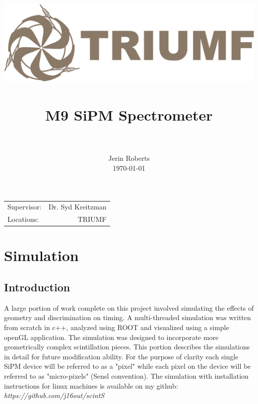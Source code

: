 \documentclass[paper=a4, fontsize=11pt]{scrartcl}
\title{
		\usefont{OT1}{bch}{b}{n}
		\normalfont \normalsize \textsc{} \\ [25pt]
		\includegraphics[width=0.5\linewidth]{tri} \\
		\horrule{0.5pt} \\[0.2cm]
		\huge M9 SiPM Spectrometer \\
		\horrule{2pt} \\[0.005cm]
}
\author{
		\normalfont 								\normalsize
        Jerin Roberts\\[-5pt]		\normalsize
        \today
}
\date{}
\numberwithin{equation}{section}		%
\numberwithin{figure}{section}			%
\numberwithin{table}{section}				%
\begin{document}
\maketitle
\begin{center}
\begin{tabular}{l r}


Supervisor: & Dr. Syd Kreitzman  \\ %
Locations: & TRIUMF


\end{tabular}
\end{center}
\newpage
\tableofcontents
\listoffigures
\listoftables
\newpage
\lstset{language=[Visual]C++}

\section{Simulation}
\subsection{Introduction}
A large portion of work complete on this project involved simulating the effects of geometry and discrimination on timing. A multi-threaded simulation was written from scratch in c++, analyzed using ROOT and visualized using a simple openGL application. The simulation was designed to incorporate more geometrically complex scintillation pieces. This portion describes the simulations in detail for future modification ability. For the purpose of clarity each single SiPM device will be referred to as a "pixel" while each pixel on the device will be referred to as "micro-pixels" (Sensl convention). The simulation with installation instructions for linux machines is available on my github: \textit{https://github.com/j16out/scintS}
\end{document}
